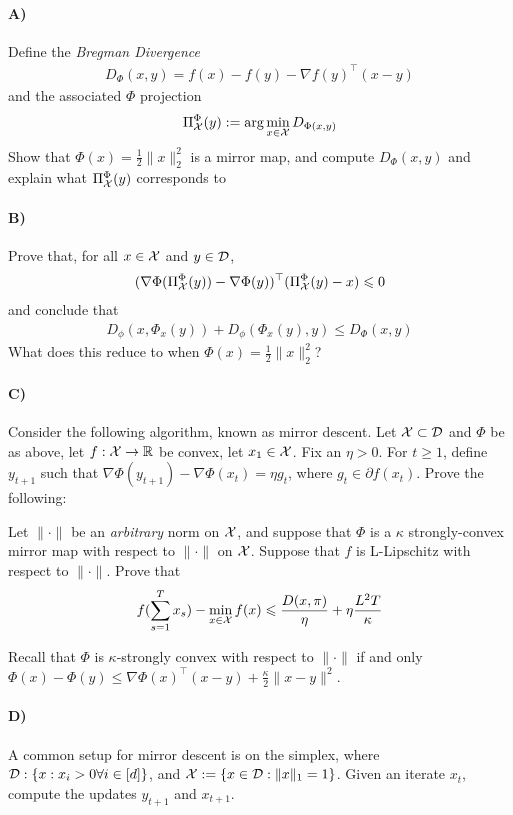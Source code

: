 \documentclass[12pt]{article}
\begin{document}
\paragraph{A)} Define the \emph{Bregman Divergence}
\begin{eqnarray}
D_{\Phi}(x,y) = f(x) - f(y) - \nabla f(y)^{\top}(x-y)
\end{eqnarray}
and the associated $\Phi$ projection
\begin{eqnarray}
\Pi_{{\cal X}}^{\Phi}(y):= \arg\min_{x \in {\cal X}} D_{\Phi(x,y)}
\end{eqnarray}
Show that $\Phi(x) = \frac{1}{2}\|x\|^2_2$ is a mirror map, and compute $D_{\Phi}(x,y)$ and explain what $\Pi_{{\cal X}}^{\Phi}(y)$ corresponds to
\paragraph{B)} Prove that, for all $x \in {\cal X}$ and $y \in {\cal D}$,
\begin{eqnarray}
(\nabla \Phi(\Pi_{{\cal X}}^{\Phi}(y)) - \nabla \Phi(y))^\top(\Pi_{{\cal X}}^{\Phi}(y) - x) \leqslant 0
\end{eqnarray}
and conclude that
\begin{eqnarray}
D_{\phi}(x,\Phi_{x}(y)) + D_{\phi}(\Phi_{x}(y),y) \le D_{\Phi}(x,y) 
\end{eqnarray}
What does this reduce to when $\Phi(x) = \frac{1}{2}\|x\|^2_2$?
\paragraph{C)} Consider the following algorithm, known as mirror descent. Let ${\cal X} \subset {\cal D}$ and $\Phi$ be as above, let $f: {\cal X} \to \mathbb{R}$ be convex, let $x_1  \in {\cal X}$. Fix an $\eta > 0$. For $t \ge 1$, define $y_{t+1}$ such that $\nabla \Phi(y_{t+1}) - \nabla \Phi(x_{t}) = \eta g_t$, where $g_t \in \partial f(x_t)$. Prove the following:
\begin{theorem*} Let $\|\cdot\|$ be an \emph{arbitrary} norm on ${\cal X}$, and suppose that $\Phi$ is a $\kappa$ strongly-convex mirror map with respect to $\|\cdot\|$ on ${\cal X}$. Suppose that $f$ is L-Lipschitz with respect to $\|\cdot\|$. Prove that 
\begin{eqnarray}
f(\sum_{s=1}^T x_s) - \min_{x \in {\cal X}} f(x) \leqslant \frac{D(x,\pi)}{\eta} + \eta \frac{L^2 T}{\kappa}
\end{eqnarray}
\end{theorem*}
Recall that $\Phi$ is $\kappa$-strongly convex with respect to $\|\cdot\|$ if and only $\Phi(x)  - \Phi(y) \le \nabla \Phi(x)^\top (x-y) + \frac{\kappa}{2}\|x-y\|^2$. 
\paragraph{D)} A common setup for mirror descent is on the simplex, where ${\cal D}: \{x: x_i > 0 \forall i \in [d]\}$, and ${\cal X} := \{x \in {\cal D}:\|x\|_1 = 1\}$. Given an iterate $x_t$, compute the updates $y_{t+1}$ and $x_{t+1}$. 
\end{document}
